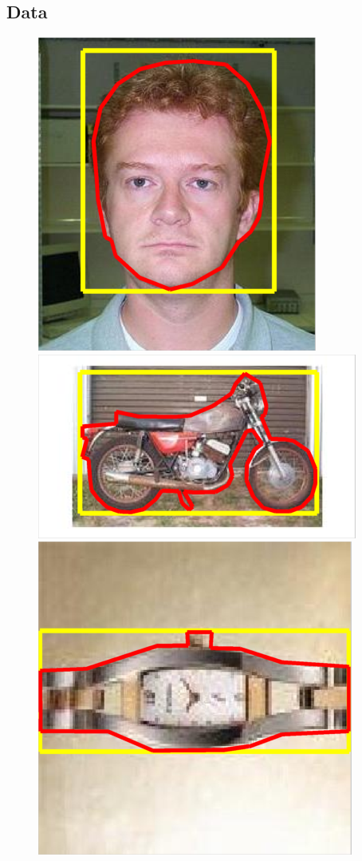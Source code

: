 \documentclass[10pt,journal,cspaper,compsoc]{IEEEtran}
\begin{document}
%
\subsection{Data\label{sec:data}}
%
%
\begin{figure}[h]
\begin{center}
  \includegraphics[width=0.25\linewidth]{resources/caltech-101_face_example.png}
  \includegraphics[width=0.4\linewidth]{resources/caltech-101_motorbikes_example.png}
  \includegraphics[width=0.25\linewidth]{resources/caltech-101_watch_example.png}\\

\end{center}
\end{figure}
\end{document}
